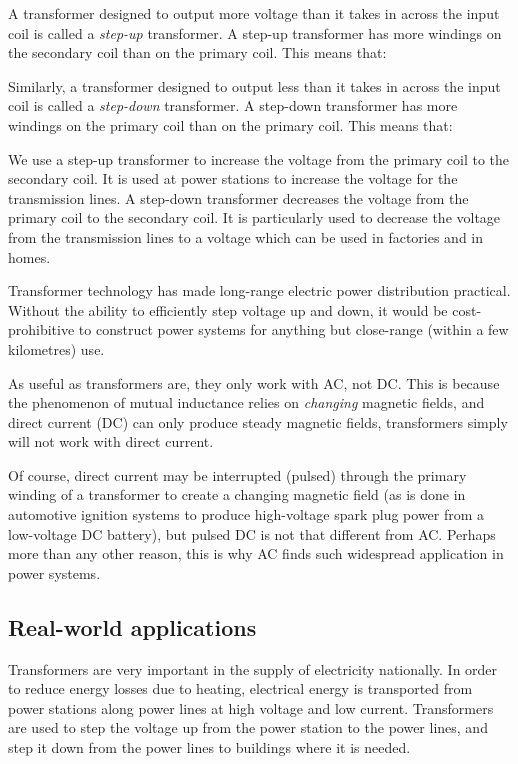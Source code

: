 A transformer designed to output more voltage than it takes in
across the input coil is called a \textit{step-up} transformer. A
step-up transformer has more windings on the secondary coil than
on the primary coil. This means that: 

Similarly, a transformer designed to output less than it takes in
across the input coil is called a \textit{step-down} transformer.
A step-down transformer has more windings on the primary coil than
on the primary coil. This means that: 

We use a step-up transformer to increase the voltage from the primary coil to the secondary coil. It is used at power stations to increase the voltage for the transmission lines.
A step-down transformer decreases the voltage from the primary coil to the secondary coil. It is particularly used to decrease the voltage from the transmission lines to a voltage which can be used in factories and in homes.

Transformer technology has made long-range electric power
distribution practical. Without the ability to efficiently step
voltage up and down, it would be cost-prohibitive to construct
power systems for anything but close-range (within a few kilometres) use.

As useful as transformers are, they only work with AC,
not DC. This is because the phenomenon of mutual inductance relies on
\textit{changing} magnetic fields, and direct current (DC) can
only produce steady magnetic fields, transformers simply will not
work with direct current.

Of course, direct current may be
interrupted (pulsed) through the primary winding of a transformer
to create a changing magnetic field (as is done in automotive
ignition systems to produce high-voltage spark plug power from a
low-voltage DC battery), but pulsed DC is not that different from
AC. Perhaps more than any other reason, this is why AC finds such
widespread application in power systems.
\subsection{Real-world applications}
Transformers are very important in the supply of electricity
nationally. In order to reduce energy losses due to heating,
electrical energy is transported from power stations along power
lines at high voltage and low current.  Transformers are used to
step the voltage up from the power station to the power lines, and
step it down from the power lines to buildings where it is needed.



